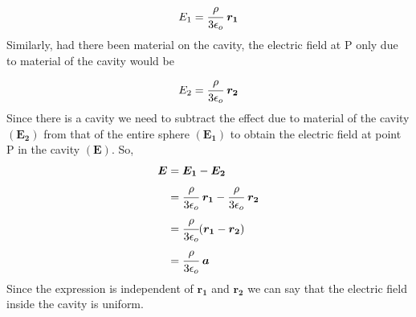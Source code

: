 \begin{equation}
    E_1 = \cfrac{\rho}{3 \epsilon_o}\hspace{3pt} \bm{r_1}
\end{equation}
Similarly, had there been material on the cavity, the electric field at P only due to material of the cavity would be 
\begin{equation}
    E_2 = \cfrac{\rho}{3 \epsilon_o}\hspace{3pt} \bm{r_2}
\end{equation}
Since there is a cavity we need to subtract the effect due to material of the cavity $(\bm{E_2})$ from that of the entire sphere $(\bm{E_1})$ to obtain the electric field at point P in the cavity $(\bm{E})$. So,
\vfill
\begin{align*}
    \bm{E} &= \bm{E_1} - \bm{E_2} \\
            &= \cfrac{\rho}{3 \epsilon_o}\hspace{3pt} \bm{r_1} - \cfrac{\rho}{3 \epsilon_o}\hspace{3pt} \bm{r_2} \\
            &= \cfrac{\rho}{3 \epsilon_o} (\bm{r_1} -\bm{r_2})\\
            &= \cfrac{\rho}{3 \epsilon_o} \hspace{3pt}\bm{a}
\end{align*}
\vfill
Since the expression is independent of $\bm{r_1}$ and $\bm{r_2}$ we can say that the electric field inside the cavity is uniform. 

